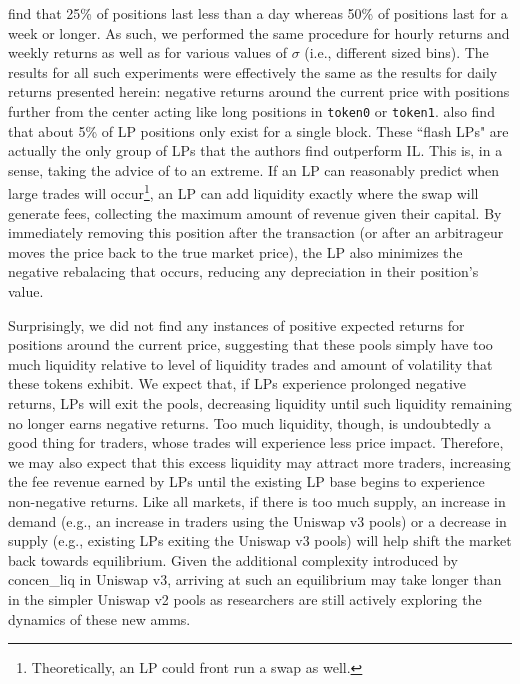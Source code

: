 \documentclass[11pt]{article}
\begin{document}
\citet{loesch2021impermanent} find that 25\% of positions last less than a day whereas 50\% of positions last for a week or longer. As such, we performed the same procedure for hourly returns and weekly returns as well as for various values of $\sigma$ (i.e., different sized bins). The results for all such experiments were effectively the same as the results for daily returns presented herein: negative returns around the current price with positions further from the center acting like long positions in \texttt{token0} or \texttt{token1}. \citet{loesch2021impermanent} also find that about 5\% of LP positions only exist for a single block. These ``flash LPs" are actually the only group of LPs that the authors find outperform IL. This is, in a sense, taking the advice of \citet{LambertMedium2} to an extreme. If an LP can reasonably predict when large trades will occur\footnote{Theoretically, an LP could front run a swap as well.}, an LP can add liquidity exactly where the swap will generate fees, collecting the maximum amount of revenue given their capital. By immediately removing this position after the transaction (or after an arbitrageur moves the price back to the true market price), the LP also minimizes the negative rebalacing that occurs, reducing any depreciation in their position's value.

Surprisingly, we did not find any instances of positive expected returns for positions around the current price, suggesting that these pools simply have too much liquidity relative to level of liquidity trades and amount of volatility that these tokens exhibit. We expect that, if LPs experience prolonged negative returns, LPs will exit the pools, decreasing liquidity until such liquidity remaining no longer earns negative returns. Too much liquidity, though, is undoubtedly a good thing for traders, whose trades will experience less price impact. Therefore, we may also expect that this excess liquidity may attract more traders, increasing the fee revenue earned by LPs until the existing LP base begins to experience non-negative returns. Like all markets, if there is too much supply, an increase in demand (e.g., an increase in traders using the Uniswap v3 pools) or a decrease in supply (e.g., existing LPs exiting the Uniswap v3 pools) will help shift the market back towards equilibrium. Given the additional complexity introduced by  \gls{concen_liq} in Uniswap v3, arriving at such an equilibrium may take longer than in the simpler Uniswap v2 pools as researchers are still actively exploring the dynamics of these new \glspl{amm}.
\end{document}

